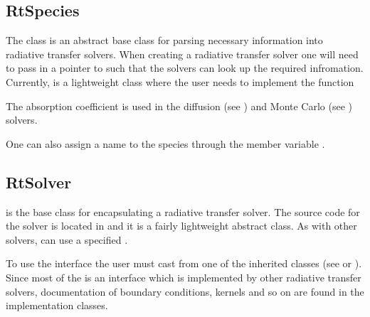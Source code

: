 \documentclass[letterpaper,10pt,english]{sphinxmanual}
\begin{document}
\subsection{RtSpecies}
\label{\detokenize{Solvers/RTE:rtspecies}}\label{\detokenize{Solvers/RTE:chap-rtspecies}}
\sphinxAtStartPar
The class  is an abstract base class for parsing necessary information into radiative transfer solvers.
When creating a radiative transfer solver one will need to pass in a pointer to  such that the solvers can look up the required infromation.
Currently,  is a lightweight class where the user needs to implement the function

\begin{sphinxVerbatim}[commandchars=\\\{\},formatcom=\scriptsize]
       
\end{sphinxVerbatim}

\sphinxAtStartPar
The absorption coefficient is used in the diffusion (see {\hyperref[\detokenize{Solvers/RTE:chap-diffusionrte}]{}}) and Monte Carlo (see {\hyperref[\detokenize{Solvers/RTE:chap-montecarlorte}]{}}) solvers.

\sphinxAtStartPar
One can also assign a name to the species through the member variable .


\subsection{RtSolver}
\label{\detokenize{Solvers/RTE:rtsolver}}\label{\detokenize{Solvers/RTE:chap-rtsolver}}
\sphinxAtStartPar
{} is the base class for encapsulating a radiative transfer solver.
The source code for the solver is located in  and it is a fairly lightweight abstract class.
As with other solvers,  can use a specified {\hyperref[\detokenize{Source/Realm:chap-realm}]{}}.

\sphinxAtStartPar
To use the  interface the user must cast from one of the inherited classes (see {\hyperref[\detokenize{Solvers/RTE:chap-diffusionrte}]{}} or {\hyperref[\detokenize{Solvers/RTE:chap-montecarlorte}]{}}).
Since most of the  is an interface which is implemented by other radiative transfer solvers, documentation of boundary conditions, kernels and so on are found in the implementation classes.
\end{document}

